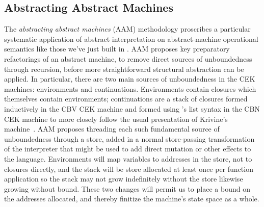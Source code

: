 \subsection{Abstracting Abstract Machines}
\label{sec:apps:aam}
%

%
The \emph{abstracting abstract machines} (AAM) methodology \cite{might2010abstract,VanHorn:2010} proscribes a particular systematic application of abstract interpretation \cite{cousot77unifiedmodel,cousot1996abstract,cousot1979systematic} on abstract-machine operational semantics like those we've just built in \slog{}.
%
AAM proposes key preparatory refactorings of an abstract machine, to remove direct sources of unboundedness through recursion, before more straightforward structural abstraction can be applied.
%
In particular, there are two main sources of unboundedness in the CEK machines: environments and continuations. Environments contain closures which themselves contain environments; continuations are a stack of closures formed inductively in the CBV CEK machine and formed using \slog{}'s list syntax in the CBN CEK machine to more closely follow the usual presentation of Krivine's machine~\cite{krivine:2007:cbn}. 
%
AAM proposes threading each such fundamental source of unboundedness through a store, added in a normal store-passing transformation of the interpreter that might be used to add direct mutation or other effects to the language. Environments will map variables to addresses in the store, not to closures directly, and the stack will be store allocated at least once per function application so the stack may not grow indefinitely without the store likewise growing without bound. These two changes will permit us to place a bound on the addresses allocated, and thereby finitize the machine's state space as a whole.


